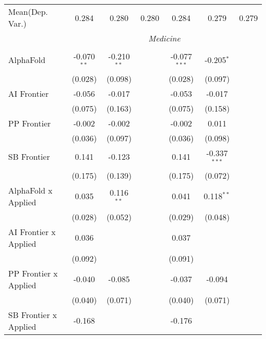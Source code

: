 \begin{tabular}{lcccccc}
Mean(Dep. Var.) & 0.284 & 0.280 & 0.280 & 0.284 & 0.279 & 0.279 \\
 & \multicolumn{6}{c}{\textit{Medicine}} \\ \\
   AlphaFold                      & -0.070$^{**}$ & -0.210$^{**}$ &                & -0.077$^{***}$ & -0.205$^{*}$   &   \\   
                                  & (0.028)       & (0.098)       &                & (0.028)        & (0.097)        &   \\   
   AI Frontier                    & -0.056        & -0.017        &                & -0.053         & -0.017         &   \\   
                                  & (0.075)       & (0.163)       &                & (0.075)        & (0.158)        &   \\   
   PP Frontier                    & -0.002        & -0.002        &                & -0.002         & 0.011          &   \\   
                                  & (0.036)       & (0.097)       &                & (0.036)        & (0.098)        &   \\   
   SB Frontier                    & 0.141         & -0.123        &                & 0.141          & -0.337$^{***}$ &   \\   
                                  & (0.175)       & (0.139)       &                & (0.175)        & (0.072)        &   \\   
   AlphaFold x Applied            & 0.035         & 0.116$^{**}$  &                & 0.041          & 0.118$^{**}$   &   \\   
                                  & (0.028)       & (0.052)       &                & (0.029)        & (0.048)        &   \\   
   AI Frontier x Applied          & 0.036         &               &                & 0.037          &                &   \\   
                                  & (0.092)       &               &                & (0.091)        &                &   \\   
   PP Frontier x Applied          & -0.040        & -0.085        &                & -0.037         & -0.094         &   \\   
                                  & (0.040)       & (0.071)       &                & (0.040)        & (0.071)        &   \\   
   SB Frontier x Applied          & -0.168        &               &                & -0.176         &                &   \\   

\end{tabular}
